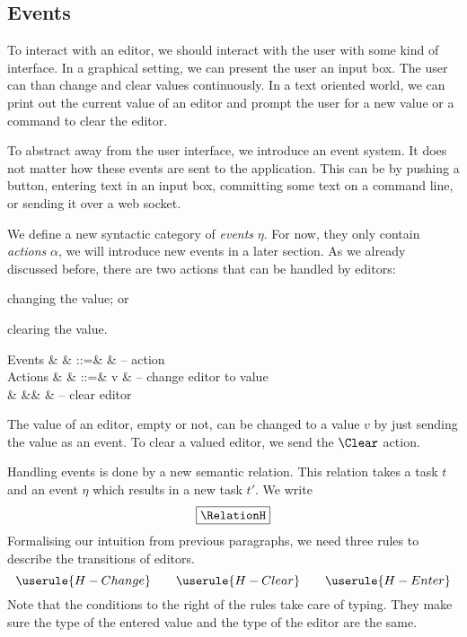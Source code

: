 \subsection{Events}

To interact with an editor,
we should interact with the user with some kind of interface.
In a graphical setting,
we can present the user an input box.
The user can than change and clear values continuously.
In a text oriented world,
we can print out the current value of an editor
and prompt the user for a new value
or a command to clear the editor.

To abstract away from the user interface,
we introduce an event system.
It does not matter how these events are sent to the application.
This can be by pushing a button,
entering text in an input box,
committing some text on a command line,
or sending it over a web socket.

We define a new syntactic category of \emph{events} $\eta$.
For now, they only contain \emph{actions} $\alpha$,
we will introduce new events in a later section.
As we already discussed before,
there are two actions that can be handled by editors:
\begin{enumerate*}
  \item changing the value; or
  \item clearing the value.
\end{enumerate*}
\begin{grammar}
  Events
    & \eta   & ::=& \alpha & – action \\
  Actions
    & \alpha & ::=& v      & – change editor to value \\
    &        &\mid& \Clear & – clear editor \\
\end{grammar}
The value of an editor, empty or not, can be changed to a value $v$ by just sending the value as an event.
To clear a valued editor, we send the $\Clear$ action.

Handling events is done by a new semantic relation.
This relation takes a task $t$ and an event $\eta$ which results in a new task $t'$.
We write
\begin{equation*}
  \boxed{\RelationH}
\end{equation*}
Formalising our intuition from previous paragraphs,
we need three rules to describe the transitions of editors.
\begin{equation*}
  \userule{H-Change} \qquad \userule{H-Clear} \qquad \userule{H-Enter}
\end{equation*}
Note that the conditions to the right of the rules take care of typing.
They make sure the type of the entered value and the type of the editor are the same.


